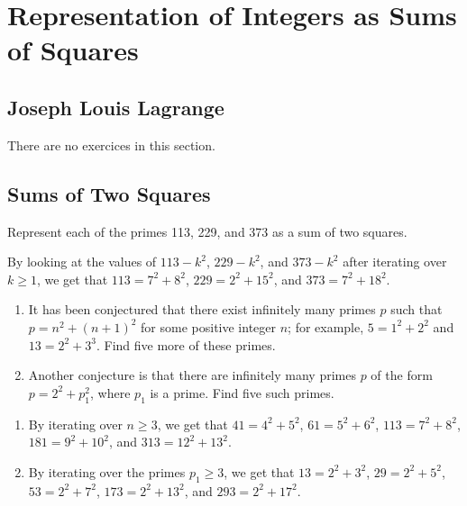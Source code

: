 \chapter{Representation of Integers as Sums of Squares}

\section{Joseph Louis Lagrange}

There are no exercices in this section.

\section{Sums of Two Squares}

\begin{exercise}
    Represent each of the primes 113, 229, and 373 as a sum of two squares. \\
\end{exercise}

\begin{solution}
    By looking at the values of $113 - k^2$, $229 - k^2$, and $373 - k^2$ after iterating over $k \geq 1$, we get that $113 = 7^2 + 8^2$, $229 = 2^2 + 15^2$, and $373 = 7^2 + 18^2$. \\
\end{solution}

\begin{exercise}
    \begin{enumerate}
        \item It has been conjectured that there exist infinitely many primes $p$ such that $p = n^2 + (n + 1)^2$ for some positive integer $n$; for example, $5 = 1^2 + 2^2$ and $13 = 2^2 + 3^3$. Find five more of these primes.
        \item Another conjecture is that there are infinitely many primes $p$ of the form $p = 2^2 + p_1^2$, where $p_1$ is a prime. Find five such primes.\\
    \end{enumerate}
\end{exercise}

\begin{solution}
    \begin{enumerate}
        \item By iterating over $n \geq 3$, we get that $41 = 4^2 + 5^2$, $61 = 5^2 + 6^2$, $113 = 7^2 + 8^2$, $181 = 9^2 + 10^2$, and $313 = 12^2 + 13^2$.
        \item By iterating over the primes $p_1 \geq 3$, we get that $13 = 2^2 + 3^2$, $29 = 2^2 + 5^2$, $53 = 2^2 + 7^2$, $173 = 2^2 + 13^2$, and $293 = 2^2 + 17^2$. \\
    \end{enumerate}
\end{solution}

